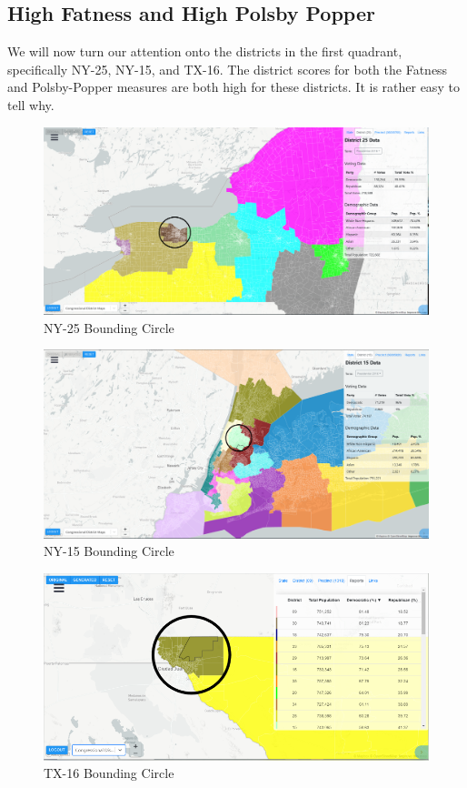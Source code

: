 \documentclass[letterpaper]{article}
\begin{document}
\subsection{High Fatness and High Polsby Popper}
We will now turn our attention onto the districts in the first quadrant, specifically NY-25, NY-15, and TX-16. The district scores for both the Fatness and Polsby-Popper measures are both high for these districts. It is rather easy to tell why.

\begin{figure}[H]
	\includegraphics[width=\linewidth]{./figures/NY-25-BoundingCircle.png}
	\caption{NY-25 Bounding Circle}
	\label{fig:ny25boundingCircle}
\end{figure}

\begin{figure}[H]
	\includegraphics[width=\linewidth]{./figures/NY-15-BoundingCircle.png}
	\caption{NY-15 Bounding Circle}
	\label{fig:ny15boundingCircle}
\end{figure}

\begin{figure}[H]
	\includegraphics[width=\linewidth]{./figures/TX-16-BoundingCircle.png}
	\caption{TX-16 Bounding Circle}
	\label{fig:tx16boundingCircle}
\end{figure}
\end{document}
